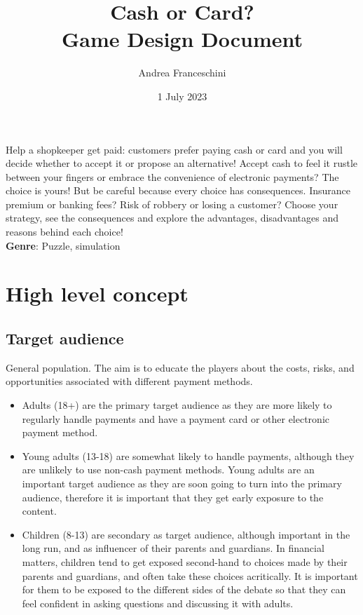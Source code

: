 \documentclass[a4paper,11pt]{article}
\title{%
	Cash or Card?\\
	\large{Game Design Document}}
\author{Andrea Franceschini}
\date{1 July 2023}
\makeatletter
\renewcommand{\maketitle}{\bgroup\setlength{\parindent}{0pt}
\begin{flushleft}
	\sffamily\LARGE\@title
\end{flushleft}\egroup
}
\makeatother
\begin{document}

\maketitle

\noindent Help a shopkeeper get paid: customers prefer paying cash or card and you
will decide whether to accept it or propose an alternative! Accept cash
to feel it rustle between your fingers or embrace the convenience of
electronic payments? The choice is yours! But be careful because every
choice has consequences. Insurance premium or banking fees? Risk of
robbery or losing a customer? Choose your strategy, see the consequences
and explore the advantages, disadvantages and reasons behind each
choice!
\\

\noindent\textbf{Genre}: Puzzle, simulation

\section{High level concept}\label{high-level-concept}

\subsection{Target audience}\label{target-audience}

General population. The aim is to educate the players about the costs,
risks, and opportunities associated with different payment methods.

\begin{itemize}
\item
  Adults (18+) are the primary target audience as they are more likely
  to regularly handle payments and have a payment card or other
  electronic payment method.
\item
  Young adults (13-18) are somewhat likely to handle payments, although
  they are unlikely to use non-cash payment methods. Young adults are an
  important target audience as they are soon going to turn into the
  primary audience, therefore it is important that they get early
  exposure to the content.
\item
  Children (8-13) are secondary as target audience, although important
  in the long run, and as influencer of their parents and guardians. In
  financial matters, children tend to get exposed second-hand to choices
  made by their parents and guardians, and often take these choices
  acritically. It is important for them to be exposed to the different
  sides of the debate so that they can feel confident in asking
  questions and discussing it with adults.
\end{itemize}
\end{document}
